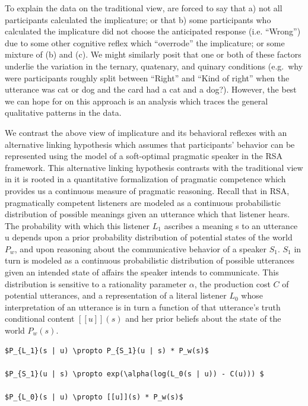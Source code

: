 \documentclass[floatsintext,man]{apa6}
\theoremstyle{definition}
\theoremstyle{definition}
\theoremstyle{definition}
\theoremstyle{remark}
\begin{document}
To explain the data on the traditional view, are forced to say that a)
not all participants calculated the implicature; or that b) some
participants who calculated the implicature did not choose the
anticipated response (i.e. \enquote{Wrong}) due to some other cognitive
reflex which \enquote{overrode} the implicature; or some mixture of (b)
and (c). We might similarly posit that one or both of these factors
underlie the variation in the ternary, quatenary, and quinary conditions
(e.g.~why were participants roughly split between \enquote{Right} and
\enquote{Kind of right} when the utterance was cat or dog and the card
had a cat and a dog?). However, the best we can hope for on this
approach is an analysis which traces the general qualitative patterns in
the data.

We contrast the above view of implicature and its behavioral reflexes
with an alternative linking hypothesis which assumes that participants'
behavior can be represented using the model of a soft-optimal pragmatic
speaker in the RSA framework. This alternative linking hypothesis
contrasts with the traditional view in it is rooted in a quantitative
formalization of pragmatic competence which provides us a continuous
measure of pragmatic reasoning. Recall that in RSA, pragmatically
competent listeners are modeled as a continuous probabilistic
distribution of possible meanings given an utterance which that listener
hears. The probability with which this listener \(L_1\) ascribes a
meaning s to an utterance u depends upon a prior probability
distribution of potential states of the world \(P_w\), and upon
reasoning about the communicative behavior of a speaker \(S_1\). \(S_1\)
in turn is modeled as a continuous probabilistic distribution of
possible utterances given an intended state of affairs the speaker
intends to communicate. This distribution is sensitive to a rationality
parameter \(\alpha\), the production cost \(C\) of potential utterances,
and a representation of a literal listener \(L_0\) whose interpretation
of an utterance is in turn a function of that utterance's truth
conditional content \([[u]](s)\) and her prior beliefs about the state
of the world \(P_w(s)\).

\begin{verbatim}
$P_{L_1}(s | u) \propto P_{S_1}(u | s) * P_w(s)$

$P_{S_1}(u | s) \propto exp(\alpha(log(L_0(s | u)) - C(u))) $

$P_{L_0}(s | u) \propto [[u]](s) * P_w(s)$
\end{verbatim}
\end{document}

